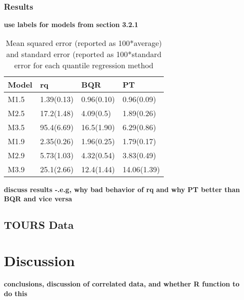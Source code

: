 \documentclass[12pt]{article}
\begin{document}
\subsubsection{Results}

{\bf use labels for models from section 3.2.1}
\begin{center}
\begin{table}[htbp]
\centering
\caption[]{ Mean squared error (reported as 100*average) and standard
  error (reported as 100*standard error for each
  quantile regression method}
\vspace{4mm}
\begin{tabular}[tb]{|l|l|l|l|}
\hline
Model & rq         & BQR        & PT          \\
\hline
M1.5  & 1.39(0.13) & 0.96(0.10) & 0.96(0.09)  \\
M2.5  & 17.2(1.48) & 4.09(0.5)  & 1.89(0.26)  \\
M3.5  & 95.4(6.69) & 16.5(1.90) & 6.29(0.86)  \\
\hline
M1.9  & 2.35(0.26) & 1.96(0.25) & 1.79(0.17)  \\
M2.9  & 5.73(1.03) & 4.32(0.54) & 3.83(0.49)  \\
M3.9  & 25.1(2.66) & 12.4(1.44) & 14.06(1.39) \\
\hline
\end{tabular}

\end{table}
\end{center}


{\bf discuss results -.e.g, why bad behavior of rq and why PT better
  than BQR and vice versa}

\subsection{TOURS Data}
% 
% 

\section{Discussion}
{\bf conclusions, discussion of correlated data, and whether R
  function to do this}
\end{document}
